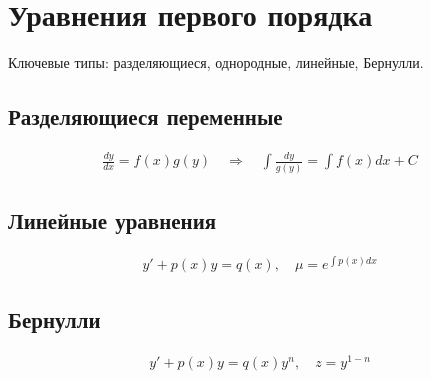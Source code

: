 \section{Уравнения первого порядка}
Ключевые типы: разделяющиеся, однородные, линейные, Бернулли.

\subsection{Разделяющиеся переменные}
\begin{align}
\frac{dy}{dx} = f(x)g(y) \quad \Rightarrow \quad \int \frac{dy}{g(y)} = \int f(x)dx + C
\end{align}

\subsection{Линейные уравнения}
\begin{align}
y' + p(x)y = q(x),\quad \mu = e^{\int p(x)dx}
\end{align}

\subsection{Бернулли}
\begin{align}
y' + p(x)y = q(x) y^n,\quad z = y^{1-n}
\end{align}



